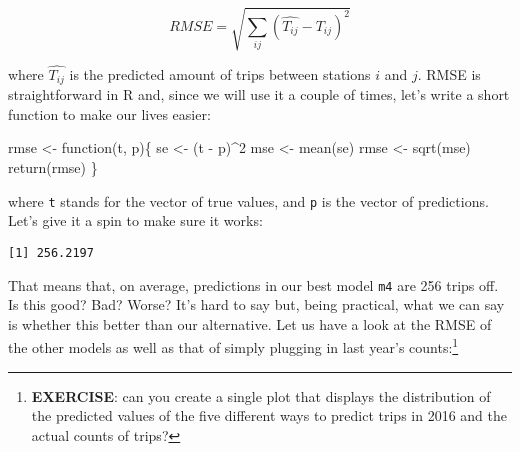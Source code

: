 \documentclass[
  letterpaper,
  krantz2]{style/krantz}
\newenvironment{Shaded}{\begin{snugshade}}{\end{snugshade}}
\newcommand{\ControlFlowTok}[1]{\textcolor[rgb]{0.00,0.23,0.31}{#1}}
\newcommand{\DecValTok}[1]{\textcolor[rgb]{0.68,0.00,0.00}{#1}}
\newcommand{\FunctionTok}[1]{\textcolor[rgb]{0.28,0.35,0.67}{#1}}
\newcommand{\NormalTok}[1]{\textcolor[rgb]{0.00,0.23,0.31}{#1}}
\newcommand{\OtherTok}[1]{\textcolor[rgb]{0.00,0.23,0.31}{#1}}
\newcommand{\SpecialCharTok}[1]{\textcolor[rgb]{0.37,0.37,0.37}{#1}}
\begin{document}
\[
RMSE = \sqrt{ \sum_{ij} (\hat{T_{ij}} - T_{ij})^2}
\]

where \(\hat{T_{ij}}\) is the predicted amount of trips between stations
\(i\) and \(j\). RMSE is straightforward in R and, since we will use it
a couple of times, let's write a short function to make our lives
easier:

\begin{Shaded}
\begin{Highlighting}[]
\NormalTok{rmse }\OtherTok{\textless{}{-}} \ControlFlowTok{function}\NormalTok{(t, p)\{}
\NormalTok{  se }\OtherTok{\textless{}{-}}\NormalTok{ (t }\SpecialCharTok{{-}}\NormalTok{ p)}\SpecialCharTok{\^{}}\DecValTok{2}
\NormalTok{  mse }\OtherTok{\textless{}{-}} \FunctionTok{mean}\NormalTok{(se)}
\NormalTok{  rmse }\OtherTok{\textless{}{-}} \FunctionTok{sqrt}\NormalTok{(mse)}
  \FunctionTok{return}\NormalTok{(rmse)}
\NormalTok{\}}
\end{Highlighting}
\end{Shaded}

where \texttt{t} stands for the vector of true values, and \texttt{p} is
the vector of predictions. Let's give it a spin to make sure it works:

\begin{Shaded}
\end{Shaded}

\begin{verbatim}
[1] 256.2197
\end{verbatim}

That means that, on average, predictions in our best model \texttt{m4}
are 256 trips off. Is this good? Bad? Worse? It's hard to say but, being
practical, what we can say is whether this better than our alternative.
Let us have a look at the RMSE of the other models as well as that of
simply plugging in last year's counts:\footnote{\textbf{EXERCISE}: can
  you create a single plot that displays the distribution of the
  predicted values of the five different ways to predict trips in 2016
  and the actual counts of trips?}
\end{document}
